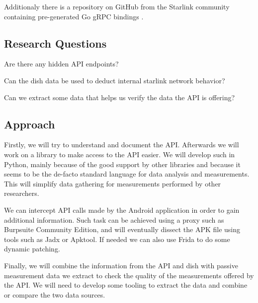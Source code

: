 \documentclass[NET,a4paper,12pt,english]{netforms}
\begin{document}
Additionaly there is a repository on GitHub from the Starlink community containing pre-generated Go gRPC bindings \cite{starlink-grpc-go}.

\subsection*{Research Questions}
\begin{researchquestions}
\item Are there any hidden API endpoints?
\item Can the dish data be used to deduct internal starlink network behavior?
\item Can we extract some data that helps us verify the data the API is offering?
\end{researchquestions}

\subsection*{Approach}
Firstly, we will try to understand and document the API.
Afterwards we will work on a library to make access to the API easier.
We will develop such in Python, mainly because of the good support by other libraries and because it seems to be the de-facto standard language
for data analysis and measurements. This will simplify data gathering for measurements performed by other researchers.

We can intercept API calls made by the Android application in order to gain additional information.
Such task can be achieved using a proxy such as Burpsuite Community Edition, and will eventually dissect the APK file
using tools such as Jadx or Apktool. If needed we can also use Frida to do some dynamic patching.

Finally, we will combine the information from the API and dish with passive measurement data we extract to check the quality of the measurements offered by the API.
We will need to develop some tooling to extract the data and combine or compare the two data sources.
\end{document}

